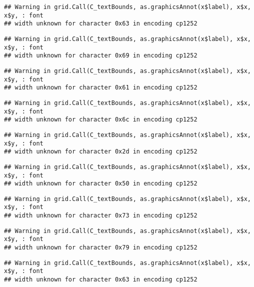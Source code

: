 \documentclass[
]{article}
\begin{document}
\begin{verbatim}
## Warning in grid.Call(C_textBounds, as.graphicsAnnot(x$label), x$x, x$y, : font
## width unknown for character 0x63 in encoding cp1252
\end{verbatim}

\begin{verbatim}
## Warning in grid.Call(C_textBounds, as.graphicsAnnot(x$label), x$x, x$y, : font
## width unknown for character 0x69 in encoding cp1252
\end{verbatim}

\begin{verbatim}
## Warning in grid.Call(C_textBounds, as.graphicsAnnot(x$label), x$x, x$y, : font
## width unknown for character 0x61 in encoding cp1252
\end{verbatim}

\begin{verbatim}
## Warning in grid.Call(C_textBounds, as.graphicsAnnot(x$label), x$x, x$y, : font
## width unknown for character 0x6c in encoding cp1252
\end{verbatim}

\begin{verbatim}
## Warning in grid.Call(C_textBounds, as.graphicsAnnot(x$label), x$x, x$y, : font
## width unknown for character 0x2d in encoding cp1252
\end{verbatim}

\begin{verbatim}
## Warning in grid.Call(C_textBounds, as.graphicsAnnot(x$label), x$x, x$y, : font
## width unknown for character 0x50 in encoding cp1252
\end{verbatim}

\begin{verbatim}
## Warning in grid.Call(C_textBounds, as.graphicsAnnot(x$label), x$x, x$y, : font
## width unknown for character 0x73 in encoding cp1252
\end{verbatim}

\begin{verbatim}
## Warning in grid.Call(C_textBounds, as.graphicsAnnot(x$label), x$x, x$y, : font
## width unknown for character 0x79 in encoding cp1252
\end{verbatim}

\begin{verbatim}
## Warning in grid.Call(C_textBounds, as.graphicsAnnot(x$label), x$x, x$y, : font
## width unknown for character 0x63 in encoding cp1252
\end{verbatim}
\end{document}
